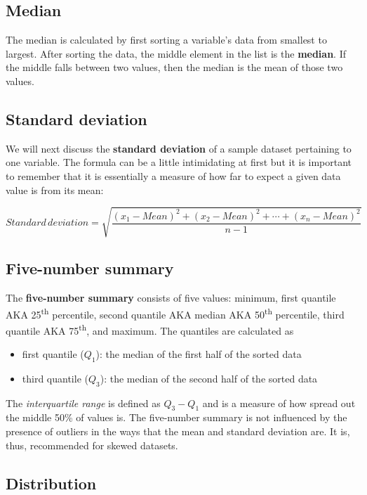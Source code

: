\documentclass[12pt,]{krantz}
\providecommand{\tightlist}{%
  \setlength{\itemsep}{0pt}\setlength{\parskip}{0pt}}
\begin{document}
\subsection{Median}\label{median}

The median is calculated by first sorting a variable's data from
smallest to largest. After sorting the data, the middle element in the
list is the \textbf{median}. If the middle falls between two values,
then the median is the mean of those two values.

\subsection{Standard deviation}\label{standard-deviation}

We will next discuss the \textbf{standard deviation} of a sample dataset
pertaining to one variable. The formula can be a little intimidating at
first but it is important to remember that it is essentially a measure
of how far to expect a given data value is from its mean:

\[Standard \, deviation = \sqrt{\frac{(x_1 - Mean)^2 + (x_2 - Mean)^2 + \cdots + (x_n - Mean)^2}{n - 1}}\]

\subsection{Five-number summary}\label{five-number-summary}

The \textbf{five-number summary} consists of five values: minimum, first
quantile AKA 25\textsuperscript{th} percentile, second quantile AKA
median AKA 50\textsuperscript{th} percentile, third quantile AKA
75\textsuperscript{th}, and maximum. The quantiles are calculated as

\begin{itemize}
\tightlist
\item
  first quantile (\(Q_1\)): the median of the first half of the sorted
  data
\item
  third quantile (\(Q_3\)): the median of the second half of the sorted
  data
\end{itemize}

The \emph{interquartile range} is defined as \(Q_3 - Q_1\) and is a
measure of how spread out the middle 50\% of values is. The five-number
summary is not influenced by the presence of outliers in the ways that
the mean and standard deviation are. It is, thus, recommended for skewed
datasets.

\subsection{Distribution}\label{distribution}
\end{document}
